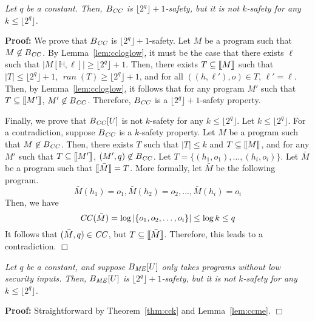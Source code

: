 \documentclass{llncs}
\newenvironment{proof}{\noindent\rm{\bf Proof:}}{\hbox{$\Box$}\vspace*{0.2\baselineskip}}
\newenvironment{reftheorem}[1]{\begin{trivlist}\item[\hskip
      \labelsep{\bf Theorem #1.}]\it}{\end{trivlist}}
\newcommand{\aset}[1]{\{{#1}\}}
\newcommand{\sembrack}[1]{[\hspace*{-1.2pt}[#1]\hspace*{-1.2pt}]}
\newcommand{\ran}{\mathop\textit{ran}\nolimits}
\begin{document}
\begin{reftheorem}{\ref{thm:cck}}
  Let $q$ be a constant.  Then, $B_{\it CC}$ is
  $\lfloor2^q\rfloor+1$-safety, but it is not $k$-safety for any $k
  \leq \lfloor2^q\rfloor$.
\end{reftheorem}
\begin{proof}
  We prove that $B_{\it CC}$ is $\lfloor 2^q\rfloor +1$-safety.  Let
  $M$ be a program such that $M\not\in B_{\it CC}$.  By
  Lemma~\ref{lem:ccloglow}, it must be the case that there exists
  $\ell$ such that $|M[\mathbb{H},\ell]|\ge\lfloor 2^q\rfloor +1$.
  Then, there exists $T \subseteq \sembrack{M}$ such that $|T| \leq
  \lfloor2^q\rfloor+1$, $\ran(T) \geq \lfloor2^q\rfloor+1$, and for
  all $((h,\ell'),o) \in T$, $\ell' = \ell$.  Then, by
  Lemma~\ref{lem:ccloglow}, it follows that for any program $M'$ such
  that $T \subseteq \sembrack{M'}$, $M' \not\in B_{\it CC}$.
  Therefore, $B_{\it CC}$ is a $\lfloor 2^q\rfloor +1$-safety
  property.

  Finally, we prove that $B_{\it CC}[U]$ is not $k$-safety for any $k
  \le \lfloor 2^q\rfloor$.  Let $k \leq \lfloor2^q\rfloor$. For a
  contradiction, suppose $B_{\it CC}$ is a $k$-safety property.  Let
  $M$ be a program such that $M\not\in B_{\it CC}$.  Then, there
  exists $T$ such that $|T|\le k$ and $T\subseteq\sembrack{M}$, and
  for any $M'$ such that $T\subseteq \sembrack{M'}$, $(M',q)\not\in
  B_{\it CC}$.  Let $T=\aset{(h_1,o_1),\dots,(h_i,o_i)}$.  Let
  $\bar{M}$ be a program such that $\sembrack{\bar{M}} = T$.  More
  formally, let $\bar{M}$ be the following program.
\[
\bar{M}(h_1)=o_1, \bar{M}(h_2)=o_2, \dots, \bar{M}(h_i)=o_i
\]
Then, we have
\[
{\it CC}(\bar{M})=\log |\aset{o_1,o_2,\dots,o_i}|\le \log k\le q
\]
It follows that $(\bar{M},q)\in {\it CC}$, but
$T\subseteq\sembrack{\bar{M}}$.  Therefore, this leads to a
contradiction.
\end{proof}

\begin{reftheorem}{\ref{thm:mek}}
  Let $q$ be a constant, and suppose $B_{\it ME}[U]$ only takes
  programs without low security inputs.  Then, $B_{\it ME}[U]$ is
  $\lfloor 2^q\rfloor +1$-safety, but it is not $k$-safety for any $k
  \leq \lfloor2^q\rfloor$.
\end{reftheorem}
\begin{proof}
  Straightforward by Theorem~\ref{thm:cck} and Lemma~\ref{lem:ccme}.
\end{proof}
\end{document}
